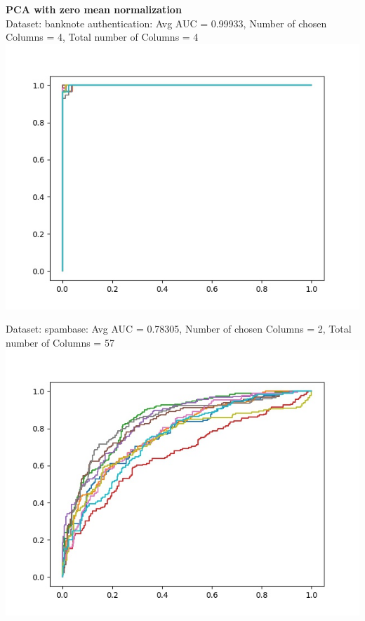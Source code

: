 \documentclass[twoside]{article}
\begin{document}
\textbf{PCA with zero mean normalization}\\

Dataset: banknote authentication: Avg AUC = 0.99933, Number of chosen Columns =  4, Total number of Columns =  4\\
\includegraphics[scale=0.4]{Plots/Banknote_PCA_Zero_Mean.jpg}

Dataset: spambase: Avg AUC = 0.78305, Number of chosen Columns =  2, Total number of Columns =  57\\
\includegraphics[scale=0.4]{Plots/Spambase_PCA_Zero_Mean.jpg}
\newpage
\end{document}
